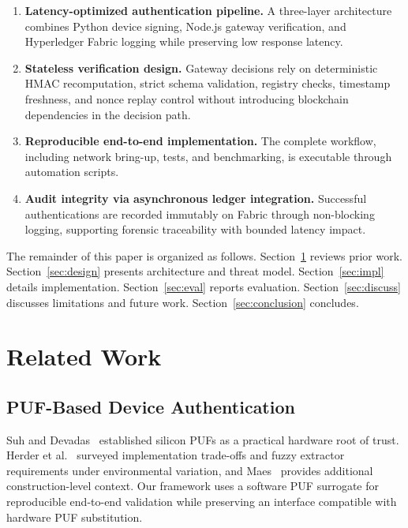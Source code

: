\documentclass[conference]{IEEEtran}
\begin{document}
\begin{enumerate}
\item \textbf{Latency-optimized authentication pipeline.} A three-layer
architecture combines Python device signing, Node.js gateway verification, and
Hyperledger Fabric logging while preserving low response latency.

\item \textbf{Stateless verification design.} Gateway decisions rely on
deterministic HMAC recomputation, strict schema validation, registry checks,
timestamp freshness, and nonce replay control without introducing blockchain
dependencies in the decision path.

\item \textbf{Reproducible end-to-end implementation.} The complete workflow,
including network bring-up, tests, and benchmarking, is executable through
automation scripts.

\item \textbf{Audit integrity via asynchronous ledger integration.} Successful
authentications are recorded immutably on Fabric through non-blocking logging,
supporting forensic traceability with bounded latency impact.
\end{enumerate}

The remainder of this paper is organized as follows. Section~\ref{sec:related}
reviews prior work. Section~\ref{sec:design} presents architecture and threat
model. Section~\ref{sec:impl} details implementation. Section~\ref{sec:eval}
reports evaluation. Section~\ref{sec:discuss} discusses limitations and future
work. Section~\ref{sec:conclusion} concludes.

\section{Related Work}
\label{sec:related}

\subsection{PUF-Based Device Authentication}

Suh and Devadas~\cite{suh2007physical} established silicon PUFs as a practical
hardware root of trust. Herder et al.~\cite{herder2014puf} surveyed
implementation trade-offs and fuzzy extractor requirements under environmental
variation, and Maes~\cite{maes2013puf} provides additional construction-level
context. Our framework uses a software PUF surrogate for reproducible
end-to-end validation while preserving an interface compatible with hardware PUF
substitution.
\end{document}
